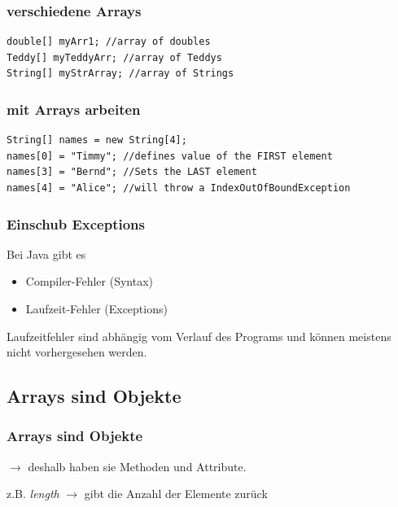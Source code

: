 \documentclass[18pt]{beamer}
\begin{document}

\begin{frame}[containsverbatim]
	\frametitle{verschiedene Arrays}
		
		\begin{lstlisting}
double[] myArr1; //array of doubles
Teddy[] myTeddyArr; //array of Teddys
String[] myStrArray; //array of Strings
		\end{lstlisting}
		
\end{frame}


\begin{frame}[containsverbatim]
	\frametitle{mit Arrays arbeiten}
		
		\begin{lstlisting}
String[] names = new String[4];
names[0] = "Timmy"; //defines value of the FIRST element
names[3] = "Bernd"; //Sets the LAST element
names[4] = "Alice"; //will throw a IndexOutOfBoundException
		\end{lstlisting}
		
\end{frame}



\begin{frame}[containsverbatim]
	\frametitle{Einschub Exceptions}
		
		Bei Java gibt es
		\begin{itemize}
			\item Compiler-Fehler (Syntax)
			\item Laufzeit-Fehler (Exceptions)
		\end{itemize}
		
		\pause	Laufzeitfehler sind abhängig vom Verlauf des Programs und können meistens nicht vorhergesehen werden.
\end{frame}


\subsection{Arrays sind Objekte}
\begin{frame}
	\frametitle{Arrays sind Objekte}
		
		$\rightarrow$ deshalb haben sie Methoden und Attribute.\pause
		
		
		z.B. \emph{length} $\rightarrow$ gibt die Anzahl der Elemente zurück
		
\end{frame}
\end{document}
